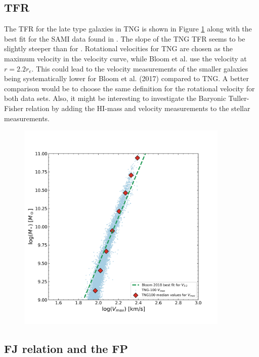 \subsection{TFR}
The TFR for the late type galaxies in TNG is shown in Figure \ref{tfr_res} along with the best fit for the SAMI data found in \textcite{Bloom2017}. The slope of the TNG TFR seems to be slightly steeper than for \textcite{Bloom2017}. Rotational velocities for TNG are chosen as the maximum velocity in the velocity curve, while Bloom et al. use the velocity at $r = 2.2 r_e$. This could lead to the velocity measurements of the smaller galaxies being systematically lower for Bloom et al. (2017) compared to TNG. A better comparison would be to choose the same definition for the rotational velocity for both data sets. Also, it might be interesting to investigate the Baryonic Tuller-Fisher relation by adding the HI-mass and velocity measurements to the stellar measurements.

\begin{figure}
    \centering
    \includegraphics[width=0.9\textwidth]{images/results_tully_fisher.png}
    \caption{}
    \label{tfr_res}
\end{figure}

\subsection{FJ relation and the FP}


